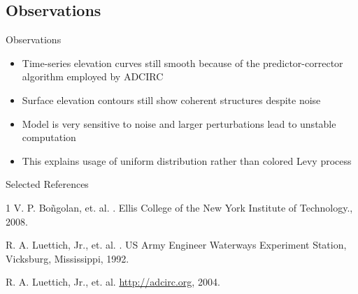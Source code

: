 \documentclass[10pt]{beamer}
\begin{document}
\subsection{Observations}
\begin{frame}{Observations}
	\begin{itemize}
		\item<1-> Time-series elevation curves still smooth because of the predictor-corrector algorithm employed by ADCIRC
		\item<1-> Surface elevation contours still show coherent structures despite noise
		\item<1-> Model is very sensitive to noise and larger perturbations lead to unstable computation
		\item<1-> This explains usage of uniform distribution rather than colored Levy process
	\end{itemize}
\end{frame}

\begin{frame}[noframenumbering]{Selected References}
\begin{thebibliography}{1}	
V. P. Bo\~{n}golan, et. al.
.
\newblock Ellis College of the New York Institute of Technology., 2008.
	
R. A. Luettich, Jr., et. al.
.
\newblock US Army Engineer Waterways Experiment Station, Vicksburg, Mississippi, 1992.

R. A. Luettich, Jr., et. al.
\newblock \url{http://adcirc.org}, 2004.
\end{thebibliography}
\end{frame}

{\SCLendpagebg
\begin{frame}
\end{frame}}
\end{document}

